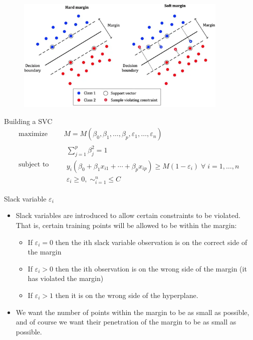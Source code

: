 \documentclass{beamer}
\begin{document}
\begin{frame}
  \begin{figure}
    \includegraphics[width=0.9\textwidth]{SVM3}
  \end{figure}
\end{frame}

\begin{frame}{Building a SVC}
  \begin{equation*}
    \begin{aligned}
      \text{maximize } \quad & M=M(\beta_0,\beta_1,\ldots,\beta_p,\varepsilon_1,\ldots,\varepsilon_n) \\
      \text{subject to }\quad &
      \begin{array}{l}
        \sum_{j=1}^p \beta_j^2 =1 \\
        y_i(\beta_0+\beta_1x_{i1}+\cdots+\beta_p x_{ip})\geq M(1-\varepsilon_i) \; \forall \; i=1,\ldots,n\\
        \varepsilon_i\geq 0, \; \sim_{i=1}^n\leq C
      \end{array}
    \end{aligned}
  \end{equation*}
\end{frame}

\begin{frame}{Slack variable $\varepsilon_i$}
  \begin{itemize}
    \item Slack variables are introduced to allow certain constraints to be violated. That is, certain training points will be allowed to be within the margin:
    \begin{itemize}
      \item If $\varepsilon_i = 0$ then the ith slack variable observation is on the correct side of the margin
      \item If $\varepsilon_i > 0$ then the ith observation is on the wrong side of the margin (it has violated the margin)
      \item If $\varepsilon_i > 1$ then it is on the wrong side of the hyperplane.
    \end{itemize}
    \item We want the number of points within the margin to be as small as possible, and of course we want their penetration of the margin to be as small as possible.
  \end{itemize}
\end{frame}
\end{document}
